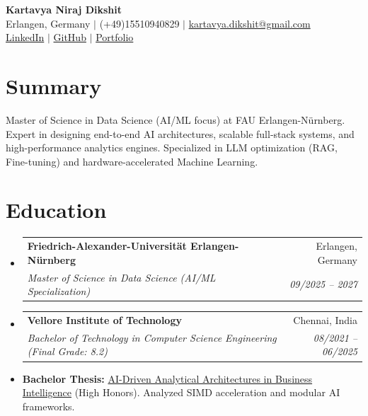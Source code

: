 \documentclass[10pt,a4paper]{article}
\makeatletter
\newcommand{\resumeItem}[1]{\item\small{#1}}
\newcommand{\resumeSubheading}[4]{
  \vspace{-1pt}\item
    \begin{tabular*}{1.0\textwidth}[t]{l@{\extracolsep{\fill}}r}
      \textbf{#1} & #2 \\
      \textit{\small#3} & \textit{\small #4} \\
    \end{tabular*}\vspace{-5pt}
}
\makeatother
\begin{document}
\begin{center}
    \textbf{\huge Kartavya Niraj Dikshit} \\ \vspace{4pt}
    \small Erlangen, Germany $|$ (+49)15510940829 $|$ \href{mailto:kartavya.dikshit@gmail.com}{kartavya.dikshit@gmail.com} \\
    \small \href{https://www.linkedin.com/in/kartavya-dikshit}{LinkedIn} $|$ \href{https://github.com/KartavyaDikshit}{GitHub} $|$ \href{https://kartavyadikshit.github.io/}{Portfolio}
\end{center}

\section{Summary}
Master of Science in Data Science (AI/ML focus) at FAU Erlangen-Nürnberg. Expert in designing end-to-end AI architectures, scalable full-stack systems, and high-performance analytics engines. Specialized in LLM optimization (RAG, Fine-tuning) and hardware-accelerated Machine Learning.

\section{Education}
\begin{itemize}[label={}]
    \resumeSubheading
      {Friedrich-Alexander-Universität Erlangen-Nürnberg}{Erlangen, Germany}
      {Master of Science in Data Science (AI/ML Specialization)}{09/2025 -- 2027}
    \resumeSubheading
      {Vellore Institute of Technology}{Chennai, India}
      {Bachelor of Technology in Computer Science Engineering (Final Grade: 8.2)}{08/2021 -- 06/2025}
      \resumeItem{\textbf{Bachelor Thesis:} \href{http://datums.ai/}{AI-Driven Analytical Architectures in Business Intelligence} (High Honors). Analyzed SIMD acceleration and modular AI frameworks.}
\end{itemize}
\end{document}
